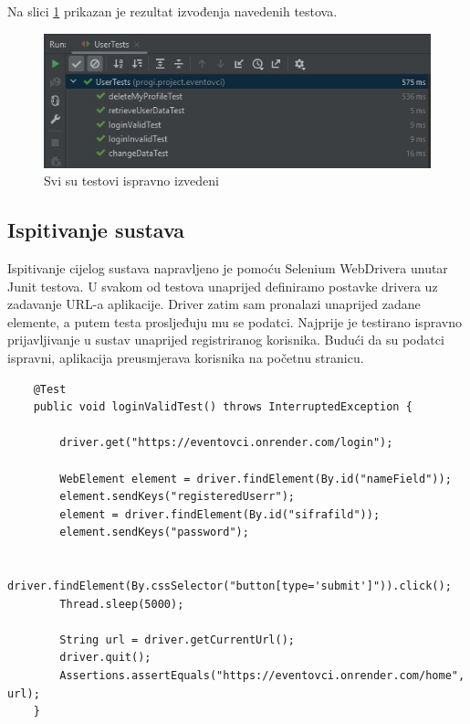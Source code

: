 			Na slici \ref{komp} prikazan je rezultat izvođenja navedenih testova. 
			
			\begin{figure}[H]
				\includegraphics[width=\textwidth]{slike/ispitivanje_komponenti.jpeg} 
				\centering
				\vspace{-0.2cm}
				\caption{Svi su testovi ispravno izvedeni}
				\label{komp}
			\end{figure}
			
			
			
			\subsection{Ispitivanje sustava}
			
			 Ispitivanje cijelog sustava napravljeno je pomoću Selenium WebDrivera unutar Junit testova. U svakom od testova unaprijed definiramo postavke drivera uz zadavanje URL-a aplikacije. Driver zatim sam pronalazi unaprijed zadane elemente, a putem testa prosljeđuju mu se podatci. Najprije je testirano ispravno prijavljivanje u sustav unaprijed registriranog korisnika. Budući da su podatci ispravni, aplikacija preusmjerava korisnika na početnu stranicu.
			 
\begin{lstlisting}
	@Test
	public void loginValidTest() throws InterruptedException {
		
		driver.get("https://eventovci.onrender.com/login");
		
		WebElement element = driver.findElement(By.id("nameField"));
		element.sendKeys("registeredUserr");
		element = driver.findElement(By.id("sifrafild"));
		element.sendKeys("password");
		
		driver.findElement(By.cssSelector("button[type='submit']")).click();
		Thread.sleep(5000);
		
		String url = driver.getCurrentUrl();
		driver.quit();
		Assertions.assertEquals("https://eventovci.onrender.com/home", url);
	}
	
\end{lstlisting}

